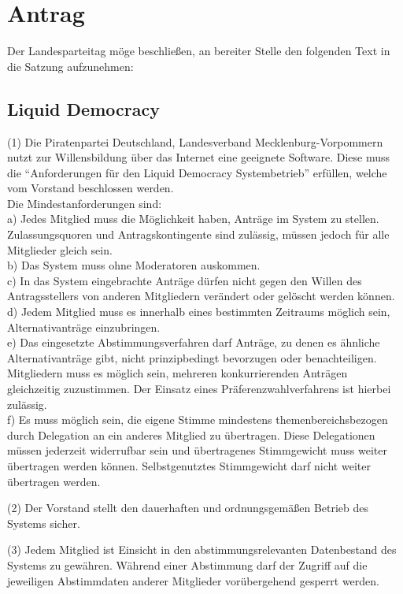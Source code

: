 \section{Antrag}

Der Landesparteitag möge beschließen, an bereiter Stelle den folgenden Text in die Satzung aufzunehmen:

\subsection{Liquid Democracy}

(1) Die Piratenpartei Deutschland, Landesverband Mecklenburg-Vorpommern nutzt zur Willensbildung über das Internet eine geeignete Software. Diese muss die ``Anforderungen für den Liquid Democracy Systembetrieb'' erfüllen, welche vom Vorstand beschlossen werden.\\Die Mindestanforderungen sind:\\a) Jedes Mitglied muss die Möglichkeit haben, Anträge im System zu stellen. Zulassungsquoren und Antragskontingente sind zulässig, müssen jedoch für alle Mitglieder gleich sein.\\b) Das System muss ohne Moderatoren auskommen.\\c) In das System eingebrachte Anträge dürfen nicht gegen den Willen des Antragsstellers von anderen Mitgliedern verändert oder gelöscht werden können.\\d) Jedem Mitglied muss es innerhalb eines bestimmten Zeitraums möglich sein, Alternativanträge einzubringen.\\e) Das eingesetzte Abstimmungsverfahren darf Anträge, zu denen es ähnliche Alternativanträge gibt, nicht prinzipbedingt bevorzugen oder benachteiligen. Mitgliedern muss es möglich sein, mehreren konkurrierenden Anträgen gleichzeitig zuzustimmen. Der Einsatz eines Präferenzwahlverfahrens ist hierbei zulässig.\\f) Es muss möglich sein, die eigene Stimme mindestens themenbereichsbezogen durch Delegation an ein anderes Mitglied zu übertragen. Diese Delegationen müssen jederzeit widerrufbar sein und übertragenes Stimmgewicht muss weiter übertragen werden können. Selbstgenutztes Stimmgewicht darf nicht weiter übertragen werden.

(2) Der Vorstand stellt den dauerhaften und ordnungsgemäßen Betrieb des Systems sicher.

(3) Jedem Mitglied ist Einsicht in den abstimmungsrelevanten Datenbestand des Systems zu gewähren. Während einer Abstimmung darf der Zugriff auf die jeweiligen Abstimmdaten anderer Mitglieder vorübergehend gesperrt werden.

